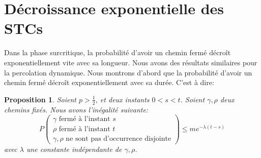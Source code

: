 \documentclass[titlepage,a4paper,12pt]{article}
\newcounter{prop}
\newtheorem{decexp}[prop]{Proposition}
\begin{document}
\section{Décroissance exponentielle des STCs}
Dans la phase surcritique, la probabilité d'avoir un chemin fermé décroît exponentiellement vite avec sa longueur. Nous avons des résultats similaires pour la percolation dynamique. Nous montrons d'abord que la probabilité d'avoir un chemin fermé décroît exponentiellement avec sa durée. C'est à dire:

\begin{decexp}
Soient $p>\frac{1}{2}$, et deux instants $0<s<t$. Soient $\gamma,\rho$ deux chemins fixés. Nous avons l'inégalité suivante:
$$P\left(\begin{array}{c} \gamma \text{ fermé à l'instant }s\\
\rho \text{ fermé à l'instant }t\\
\gamma, \rho \text{ ne sont pas d'occurrence disjointe}
\end{array}\right)\leqslant me^{-\lambda(t-s)}
$$
avec $\lambda$ une constante indépendante de $\gamma,\rho$.
\end{decexp}
\end{document}
